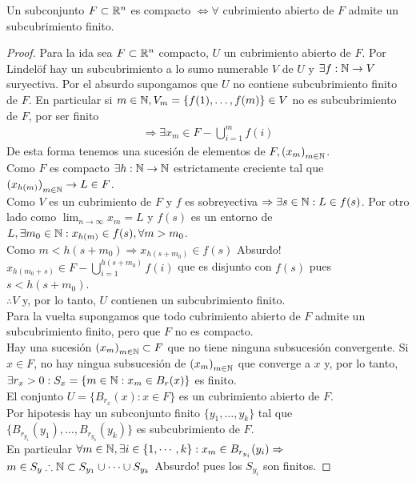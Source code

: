 \begin{corollary}
  Un subconjunto \(F \subset \mathbb{R}^n\) es compacto \(\iff \forall \) cubrimiento abierto de \(F\) admite un subcubrimiento finito.
  \begin{proof}
    Para la ida sea \(F \subset \mathbb{R}^n\) compacto, \(U\) un cubrimiento abierto de \(F\). Por Lindelöf hay un subcubrimiento a lo sumo numerable \(V\) de \(U\) y \(\exists f: \mathbb{N} \to V\) suryectiva.
    Por el absurdo supongamos que \(U\) no contiene subcubrimiento finito de \(F\).
    En particular si \(m \in \mathbb{N}, V_m = \{ f(1), \ldots, f(m) \} \in V\) no es subcubrimiento de \(F\), por ser finito
    \begin{align*}
      \Rightarrow \exists x_m \in F - \bigcup_{i = 1}^m f(i)
    \end{align*} 
    De esta forma tenemos una sucesión de elementos de \(F, {(x_m)}_{m \in \mathbb{N}} \). \\
    Como \(F\) es compacto \(\exists h: \mathbb{N} \to \mathbb{N} \) estrictamente creciente tal que \({(x_{h(m)})}_{m \in \mathbb{N}} \to L \in F\). \\
    Como \(V\) es un cubrimiento de \(F\) y \(f\) es sobreyectiva \(\Rightarrow \exists s \in \mathbb{N} : L \in f(s)\).
    Por otro lado como \(\lim_{n \to \infty} x_m = L\) y \(f(s)\) es un entorno de \(L, \exists m_0 \in \mathbb{N} : x_{h(m)} \in f(s), \forall m > m_0\). \\
    Como \(m < h(s + m_0) \Rightarrow x_{h(s+m_0)} \in f(s)\) Absurdo! \\
    \(x_{h(m_0 + s)} \in F - \bigcup_{i=1}^{h(s+m_0)} f(i)\) que es disjunto con \(f(s)\) pues \(s < h(s + m_0)\). \\
    \(\therefore V\) y, por lo tanto, \(U\) contienen un subcubrimiento finito. \\

    Para la vuelta supongamos que todo cubrimiento abierto de \(F\) admite un
    subcubrimiento finito, pero que \(F\) no es compacto. \\ Hay una sucesión
    \({(x_m)}_{m \in \mathbb{N}} \subset F\) que no tiene ninguna subsucesión convergente. Si
    \(x \in F\), no hay ningua subsucesión de \({(x_m)}_{m \in \mathbb{N}} \) que converge a \(x\)
    y, por lo tanto, \(\exists r_x > 0 : S_x = \{ m \in \mathbb{N} : x_m \in B_r(x) \} \) es
    finito. \\ El conjunto \(U = \{ B_{r_x}(x) : x \in F \} \) es un cubrimiento
    abierto de \(F\). \\ Por hipotesis hay un subconjunto finito \( \{ y_1, \ldots,
    y_k\} \) tal que \( \{ B_{r_{y_1}}(y_1), \ldots, B_{r_{y_k}}(y_k) \} \) es
    subcubrimiento de \(F\). \\ En particular \(\forall m \in \mathbb{N}, \exists i \in \{ 1,
    \cdots, k \} : x_m \in B_{r_{y_i}}(y_i) \Rightarrow \) \\ \(m \in S_y \therefore
    \mathbb{N} \subset S_{y_1} \cup \cdots \cup S_{y_k} \) Absurdo! pues los \(S_{y_i} \) son
    finitos.
  \end{proof}
\end{corollary}

